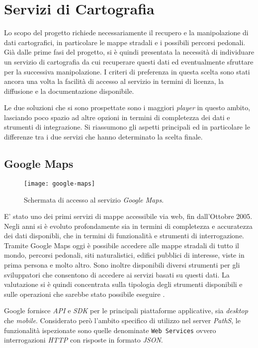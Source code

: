 
\section{Servizi di Cartografia}
Lo scopo del progetto richiede necessariamente il recupero e la manipolazione di dati cartografici, in particolare le mappe stradali e i possibili percorsi pedonali. Già dalle prime fasi del progetto, si è quindi presentata la necessità di individuare un servizio di cartografia da cui recuperare questi dati ed eventualmente sfruttare per la successiva manipolazione. I criteri di preferenza in questa scelta sono stati ancora una volta la facilità di accesso al servizio in termini di licenza, la diffusione e la documentazione disponibile.

Le due soluzioni che si sono prospettate sono i maggiori \emph{player} in questo ambito, lasciando poco spazio ad altre opzioni in termini di completezza dei dati e strumenti di integrazione. Si riassumono gli aspetti principali ed in particolare le differenze tra i due servizi che hanno determinato la scelta finale.

\subsection{Google Maps}
\begin{figure}[ht]
  \centering
  \texttt{[image: google-maps]}
  \caption{\footnotesize{Schermata di accesso al servizio \emph{Google Maps}.}}
  \label{fig:google-maps}
\end{figure}
E' stato uno dei primi servizi di mappe accessibile via web, fin dall'Ottobre 2005. Negli anni si è evoluto profondamente sia in termini di completezza e accuratezza dei dati disponibli, che in termini di funzionalità e strumenti di interrogazione. Tramite Google Maps oggi è possibile accedere alle mappe stradali di tutto il mondo, percorsi pedonali, siti naturalistici, edifici pubblici di interesse, viste in prima persona e molto altro. Sono inoltre disponibili diversi strumenti per gli sviluppatori che consentono di accedere ai servizi basati su questi dati. La valutazione si è quindi concentrata sulla tipologia degli strumenti disponibili e sulle operazioni che sarebbe stato possibile eseguire \cite{googlemaps-sdk}.

Google fornisce \emph{API} e \emph{SDK} per le principali piattaforme applicative, sia \emph{desktop} che \emph{mobile}. Considerato però l'ambito specifico di utilizzo nel server \emph{PathS}, le funzionalità ispezionate sono quelle denominate \texttt{Web Services} ovvero interrogazioni \emph{HTTP} con risposte in formato \emph{JSON}. 

